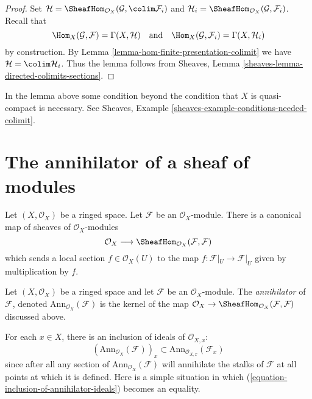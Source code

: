 \begin{proof}
Set
$\mathcal{H} = \SheafHom_{\mathcal{O}_X}(\mathcal{G}, \colim \mathcal{F}_i)$
and $\mathcal{H}_i = \SheafHom_{\mathcal{O}_X}(\mathcal{G}, \mathcal{F}_i)$.
Recall that
$$
\Hom_X(\mathcal{G}, \mathcal{F}) = \Gamma(X, \mathcal{H})
\quad\text{and}\quad
\Hom_X(\mathcal{G}, \mathcal{F}_i) = \Gamma(X, \mathcal{H}_i)
$$
by construction. By Lemma \ref{lemma-hom-finite-presentation-colimit} we have
$\mathcal{H} = \colim \mathcal{H}_i$. Thus the lemma follows from
Sheaves, Lemma \ref{sheaves-lemma-directed-colimits-sections}.
\end{proof}

\begin{remark}
\label{remark-condition-necessary}
In the lemma above some condition beyond the condition that $X$
is quasi-compact is necessary. See
Sheaves, Example \ref{sheaves-example-conditions-needed-colimit}.
\end{remark}




\section{The annihilator of a sheaf of modules}
\label{section-annihilator}

\noindent
Let $(X, \mathcal{O}_X)$ be a ringed space.
Let $\mathcal{F}$ be an $\mathcal{O}_X$-module.
There is a canonical map of sheaves of $\mathcal{O}_X$-modules
$$
\mathcal{O}_X
\longrightarrow
\SheafHom_{\mathcal{O}_X}(\mathcal{F}, \mathcal{F})
$$
which sends a local section $f \in \mathcal{O}_X(U)$ to the map
$f : \mathcal{F}|_U \to \mathcal{F}|_U$ given by multiplication by $f$.

\begin{definition}
\label{definition-annihilator-sheaf}
Let $(X, \mathcal{O}_X)$ be a ringed space and let $\mathcal{F}$
be an $\mathcal{O}_X$-module. The {\it annihilator} of $\mathcal{F}$,
denoted $\text{Ann}_{\mathcal{O}_X}(\mathcal{F})$
is the kernel of the map
$\mathcal{O}_X \to \SheafHom_{\mathcal{O}_X}(\mathcal{F}, \mathcal{F})$
discussed above.
\end{definition}

\noindent
For each $x\in X$, there is an inclusion of ideals of $\mathcal{O}_{X, x}$:
\begin{equation}
\label{equation-inclusion-of-annihilator-ideals}
(\text{Ann}_{\mathcal{O}_X}(\mathcal{F}))_x
\subset
\text{Ann}_{\mathcal{O}_{X, x}}(\mathcal{F}_x)
\end{equation}
since after all any section of $\text{Ann}_{\mathcal{O}_X}(\mathcal{F})$
will annihilate the stalks of $\mathcal{F}$ at all points at which it is
defined. Here is a simple situation in which
(\ref{equation-inclusion-of-annihilator-ideals}) becomes an equality.

